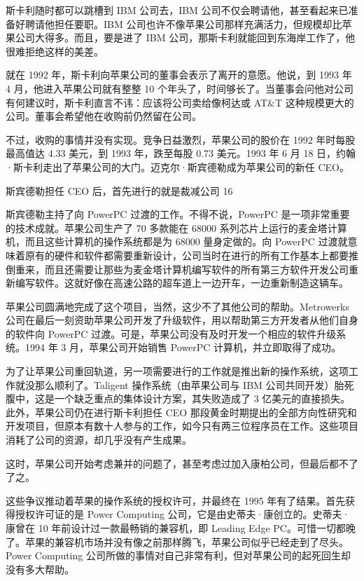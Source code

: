 \documentclass[12pt,UTF8]{ctexbook}
\begin{document}
斯卡利随时都可以跳槽到 IBM 公司去，IBM 公司不仅会聘请他，甚至看起来已准备好聘请他担任要职。IBM 公司也许不像苹果公司那样充满活力，但规模却比苹果公司大得多。而且，要是进了 IBM 公司，那斯卡利就能回到东海岸工作了，他很难拒绝这样的美差。

就在 1992 年，斯卡利向苹果公司的董事会表示了离开的意愿。他说，到 1993 年 4 月，他进入苹果公司就有整整 10 个年头了，时间够长了。当董事会问他对公司有何建议时，斯卡利直言不讳：应该将公司卖给像柯达或 AT\&T 这种规模更大的公司。董事会希望他在收购前仍然留在公司。

不过，收购的事情并没有实现。竞争日益激烈，苹果公司的股价在 1992 年时每股最高值达 4.33 美元，到 1993 年，跌至每股 0.73 美元。1993 年 6 月 18 日，约翰·斯卡利走出了苹果公司的大门。迈克尔·斯宾德勒成为苹果公司的新任 CEO。

斯宾德勒担任 CEO 后，首先进行的就是裁减公司 16%

斯宾德勒主持了向 PowerPC 过渡的工作。不得不说，PowerPC 是一项非常重要的技术成就。苹果公司生产了 70 多款能在 68000 系列芯片上运行的麦金塔计算机，而且这些计算机的操作系统都是为 68000 量身定做的。向 PowerPC 过渡就意味着原有的硬件和软件都需要重新设计，公司当时在进行的所有工作基本上都要推倒重来，而且还需要让那些为麦金塔计算机编写软件的所有第三方软件开发公司重新编写软件。这就好像在高速公路的超车道上一边开车，一边重新制造这辆车。

苹果公司圆满地完成了这个项目，当然，这少不了其他公司的帮助。Metrowerks 公司在最后一刻资助苹果公司开发了升级软件，用以帮助第三方开发者从他们自身的软件向 PowerPC 过渡。可是，苹果公司没有及时开发一个相应的软件升级系统。1994 年 3 月，苹果公司开始销售 PowerPC 计算机，并立即取得了成功。

为了让苹果公司重回轨道，另一项需要进行的工作就是推出新的操作系统，这项工作就没那么顺利了。Taligent 操作系统（由苹果公司与 IBM 公司共同开发）胎死腹中，这是一个缺乏重点的集体设计方案，其失败造成了 3 亿美元的直接损失。此外，苹果公司仍在进行斯卡利担任 CEO 那段黄金时期提出的全部方向性研究和开发项目，但原本有数十人参与的工作，如今只有两三位程序员在工作。这些项目消耗了公司的资源，却几乎没有产生成果。

这时，苹果公司开始考虑兼并的问题了，甚至考虑过加入康柏公司，但最后都不了了之。

这些争议推动着苹果的操作系统的授权许可，并最终在 1995 年有了结果。首先获得授权许可证的是 Power Computing 公司，它是由史蒂夫·康创立的。史蒂夫·康曾在 10 年前设计过一款最畅销的兼容机，即 Leading Edge PC。可惜一切都晚了。苹果的兼容机市场并没有像之前那样腾飞，苹果公司似乎已经走到了尽头。Power Computing 公司所做的事情对自己非常有利，但对苹果公司的起死回生却没有多大帮助。
\end{document}
